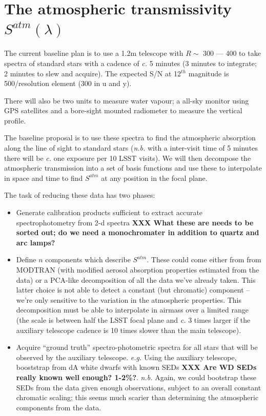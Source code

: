 \documentclass[12pt]{article}
\renewcommand{\c}{\textit{c.}\xspace}
\newcommand{\eg}{\textit{e.g.}\xspace}
\newcommand{\nb}{\textit{n.b.}\xspace}
\newcommand{\XXX}[1]{\textbf{XXX #1}\xspace}
\begin{document}
\section{The atmospheric transmissivity \texorpdfstring{$S^{atm}(\lambda)$}{Satm}}

The current baseline plan is to use a 1.2m telescope with $R \sim $ 300 --- 400 to take spectra of standard
stars with a cadence of \c 5 minutes (3 minutes to integrate; 2 minutes to slew and acquire).  The expected
S/N at 12$^{th}$ magnitude is 500/resolution element (300 in u and y).

There will also be two units to measure water vapour;  a all-sky monitor using GPS satellites
and a bore-sight mounted radiometer to measure the vertical profile.

The baseline proposal is to use these spectra to find the atmospheric absorption along the line of sight to
standard stars (\nb with a inter-visit time of 5 minutes there will be \c one exposure per 10 LSST visits).
We will then decompose the atmospheric transmission into a set of basis functions and use these to interpolate
in space and time to find $S^{atm}$ at any position in the focal plane.

The task of reducing these data has two phases:
\begin{itemize}
  \item Generate calibration products sufficient to extract accurate spectrophotometry from 2-d spectra
    \XXX{What these are needs to be sorted out; do we need a monochromater in addition to quartz and arc
      lamps?}

  \item Define $n$ components which describe $S^{atm}$.  These could come either from
    from MODTRAN (with modified aerosol absorption properties estimated from the data) or
    a PCA-like decomposition of all the data we've already taken.
    This latter choice is not able to detect a
    constant (but chromatic) component -- we're only sensitive to the variation in the atmospheric properties.
    This decomposition must be able to interpolate in airmass over
    a limited range (the scale is between half the LSST focal plane and \c 3 times larger if the auxiliary
    telescope cadence is 10 times slower than the main telescope).

  \item Acquire ``ground truth'' spectro-photometric spectra for all stars that will be observed by the
    auxiliary telescope.  \eg Using the auxiliary telescope, booststrap from dA white dwarfs with
    known SEDs \XXX{Are WD SEDs really known well enough?  1-2\%?}.  \nb  Again, we could bootstrap
    these SEDs from the data given enough observations, subject to an overall constant chromatic scaling;
    this seems much scarier than determining the atmospheric components from the data.
\end{itemize}
\end{document}
